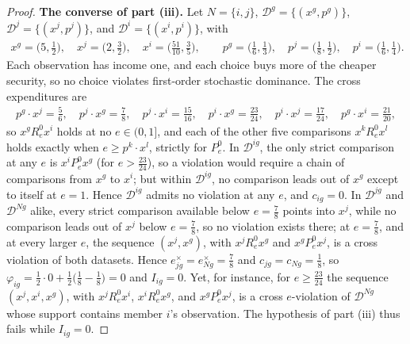 \documentclass[11 pt]{article}
\begin{document}
\begin{proof}
\textbf{The converse of part (iii).} Let $N = \{i,j\}$, $\mathcal{D}^{g} = \{ (x^{g}, p^{g}) \}$, $\mathcal{D}^{j} = \{ (x^{j}, p^{j}) \}$, and $\mathcal{D}^{i} = \{ (x^{i}, p^{i}) \}$, with
\begin{align*}
x^{g} = \bigl( 5, \tfrac{1}{2} \bigr), \quad
x^{j} = \bigl( 2, \tfrac{3}{2} \bigr), \quad
x^{i} = \bigl( \tfrac{51}{10}, \tfrac{3}{5} \bigr),
\qquad
p^{g} = \bigl( \tfrac{1}{6}, \tfrac{1}{3} \bigr), \quad
p^{j} = \bigl( \tfrac{1}{8}, \tfrac{1}{2} \bigr), \quad
p^{i} = \bigl( \tfrac{1}{6}, \tfrac{1}{4} \bigr).
\end{align*}
Each observation has income one, and each choice buys more of the cheaper security, so no choice violates first-order stochastic dominance. The cross expenditures are
\begin{align*}
p^{g} \cdot x^{j} = \tfrac{5}{6}, \quad
p^{j} \cdot x^{g} = \tfrac{7}{8}, \quad
p^{j} \cdot x^{i} = \tfrac{15}{16}, \quad
p^{i} \cdot x^{g} = \tfrac{23}{24}, \quad
p^{i} \cdot x^{j} = \tfrac{17}{24}, \quad
p^{g} \cdot x^{i} = \tfrac{21}{20},
\end{align*}
so $x^{g} \mathrel{R^{0}_{e}} x^{i}$ holds at no $e \in (0,1]$, and each of the other five comparisons $x^{k} \mathrel{R^{0}_{e}} x^{l}$ holds exactly when $e \geq p^{k} \cdot x^{l}$, strictly for $\mathrel{P^{0}_{e}}$. In $\mathcal{D}^{ig}$, the only strict comparison at any $e$ is $x^{i} \mathrel{P^{0}_{e}} x^{g}$ (for $e > \tfrac{23}{24}$), so a violation would require a chain of comparisons from $x^{g}$ to $x^{i}$; but within $\mathcal{D}^{ig}$, no comparison leads out of $x^{g}$ except to itself at $e = 1$. Hence $\mathcal{D}^{ig}$ admits no violation at any $e$, and $c_{ig} = 0$. In $\mathcal{D}^{jg}$ and $\mathcal{D}^{Ng}$ alike, every strict comparison available below $e = \tfrac{7}{8}$ points into $x^{j}$, while no comparison leads out of $x^{j}$ below $e = \tfrac{7}{8}$, so no violation exists there; at $e = \tfrac{7}{8}$, and at every larger $e$, the sequence $(x^{j}, x^{g})$, with $x^{j} \mathrel{R^{0}_{e}} x^{g}$ and $x^{g} \mathrel{P^{0}_{e}} x^{j}$, is a cross violation of both datasets. Hence $e^{\times}_{jg} = e^{\times}_{Ng} = \tfrac{7}{8}$ and $c_{jg} = c_{Ng} = \tfrac{1}{8}$, so $\varphi_{ig} = \tfrac{1}{2} \cdot 0 + \tfrac{1}{2} \bigl( \tfrac{1}{8} - \tfrac{1}{8} \bigr) = 0$ and $I_{ig} = 0$. Yet, for instance, for $e \geq \tfrac{23}{24}$ the sequence $(x^{j}, x^{i}, x^{g})$, with $x^{j} \mathrel{R^{0}_{e}} x^{i}$, $x^{i} \mathrel{R^{0}_{e}} x^{g}$, and $x^{g} \mathrel{P^{0}_{e}} x^{j}$, is a cross $e$-violation of $\mathcal{D}^{Ng}$ whose support contains member $i$'s observation. The hypothesis of part (iii) thus fails while $I_{ig} = 0$.
\end{proof}
\end{document}
